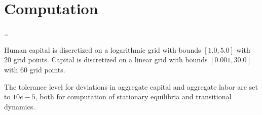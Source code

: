 \section{Computation}
\label{sec:appendix_computation}

\dots

Human capital is discretized on a logarithmic grid with bounds $[1.0, 5.0]$ with 20 grid points.
Capital is discretized on a linear grid with bounds $[0.001, 30.0]$ with 60 grid points.

The tolerance level for deviations in aggregate capital and aggregate labor are set to $10e-5$, both for computation of stationary equilibria and transitional dynamics.